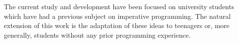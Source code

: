 The current study and development have been focused on university students which have had a previous subject on imperative programming.
The natural extension of this work is the adaptation of these ideas to teenagers or, more generally, students without any prior programming experience.

